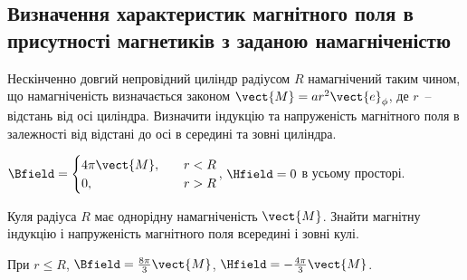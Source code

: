 \subsection*{Визначення характеристик магнітного поля в присутності маг\-нетиків з заданою намагніченістю}

\begin{problem}%
Нескінченно довгий непровідний циліндр радіусом $R$ намагнічений таким чином, що намагніченість визначається законом $\vect{M} = ar^2\vect{e}_{\phi}$, де $r$~-- відстань від осі циліндра. Визначити індукцію та напруженість магнітного поля в залежності від відстані до осі в середині та зовні циліндра.
\begin{solution}
	$\Bfield = %
		\begin{cases}
			4\pi\vect{M}, & \quad r < R \\
			0,            & \quad r > R
		\end{cases}
	$,
	$\Hfield = 0$ в усьому просторі.
\end{solution}
\end{problem}

\begin{problem}
Куля радіуса $R$ має однорідну намагніченість  $\vect{M}$. Знайти магнітну індукцію і напруженість магнітного поля всередині і зовні кулі.
\begin{solution}
	При $r \le R$, $\Bfield = \frac{8\pi}{3} \vect{M}$, $\Hfield = -\frac{4\pi}{3} \vect{M}$.
\end{solution}
\end{problem}

